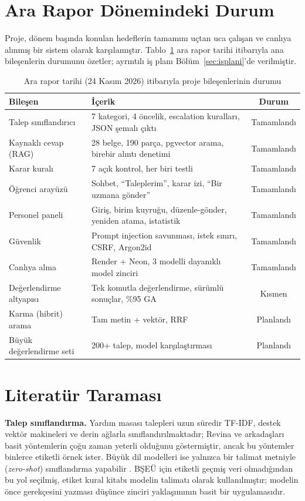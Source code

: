 \section{Ara Rapor Dönemindeki Durum}

Proje, dönem başında konulan hedeflerin tamamını uçtan uca çalışan ve canlıya alınmış bir sistem
olarak karşılamıştır. Tablo~\ref{tab:durum} ara rapor tarihi itibarıyla ana bileşenlerin durumunu
özetler; ayrıntılı iş planı Bölüm~\ref{sec:isplani}'de verilmiştir.

\begin{table}[!ht]
\centering
\caption{Ara rapor tarihi (24 Kasım 2026) itibarıyla proje bileşenlerinin durumu}
\label{tab:durum}
\small
\begin{tabularx}{\textwidth}{@{}l X c@{}}
\toprule
\textbf{Bileşen} & \textbf{İçerik} & \textbf{Durum} \\
\midrule
Talep sınıflandırıcı & 7 kategori, 4 öncelik, escalation kuralları, JSON şemalı çıktı & Tamamlandı \\
Kaynaklı cevap (RAG) & 28 belge, 190 parça, pgvector arama, birebir alıntı denetimi & Tamamlandı \\
Karar kuralı & 7 açık kontrol, her biri testli & Tamamlandı \\
Öğrenci arayüzü & Sohbet, ``Taleplerim'', karar izi, ``Bir uzmana gönder'' & Tamamlandı \\
Personel paneli & Giriş, birim kuyruğu, düzenle-gönder, yeniden atama, istatistik & Tamamlandı \\
Güvenlik & Prompt injection savunması, istek sınırı, CSRF, Argon2id & Tamamlandı \\
Canlıya alma & Render + Neon, 3 modelli dayanıklı model zinciri & Tamamlandı \\
Değerlendirme altyapısı & Tek komutla değerlendirme, sürümlü sonuçlar, \%95 GA & Kısmen \\
Karma (hibrit) arama & Tam metin + vektör, RRF \cite{cormack2009} & Planlandı \\
Büyük değerlendirme seti & 200+ talep, model karşılaştırması & Planlandı \\
\bottomrule
\end{tabularx}
\end{table}

\section{Literatür Taraması}
\label{ch:literatur}

\textbf{Talep sınıflandırma.} Yardım masası talepleri uzun süredir TF-IDF, destek vektör makineleri ve
derin ağlarla sınıflandırılmaktadır; Revina ve arkadaşları \cite{revina2020} basit yöntemlerin çoğu
zaman yeterli olduğunu göstermiştir, ancak bu yöntemler binlerce etiketli örnek ister. Büyük dil
modelleri ise yalnızca bir talimat metniyle (\textit{zero-shot}) sınıflandırma yapabilir
\cite{brown2020}. BŞEÜ için etiketli geçmiş veri olmadığından bu yol seçilmiş, etiket kural kitabı
modelin talimatı olarak kullanılmıştır; modelin önce gerekçesini yazması düşünce zinciri
yaklaşımının \cite{wei2022} basit bir uygulamasıdır.

